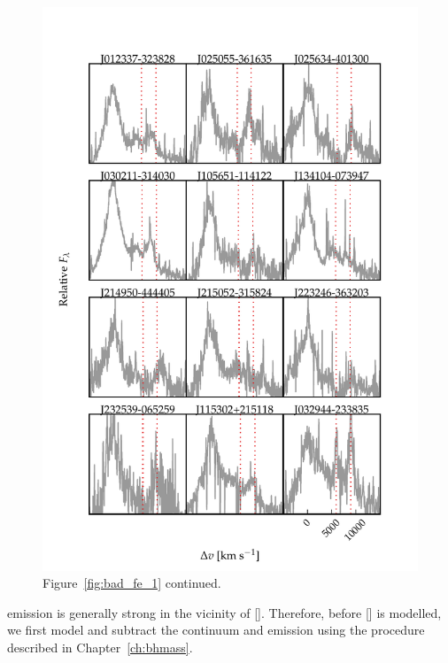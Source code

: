 \begin{figure}
    \centering
    \includegraphics[width=\columnwidth]{figures/chapter04/example_spectrum_grid_extreme_fe_2.pdf} 
    \caption{Figure~\ref{fig:bad_fe_1} continued.}     
    \label{fig:bad_fe_2}
\end{figure}

 emission is generally strong in the vicinity of []. 
Therefore, before [] is modelled, we first model and subtract the continuum and  emission using the procedure described in Chapter~\ref{ch:bhmass}. 

